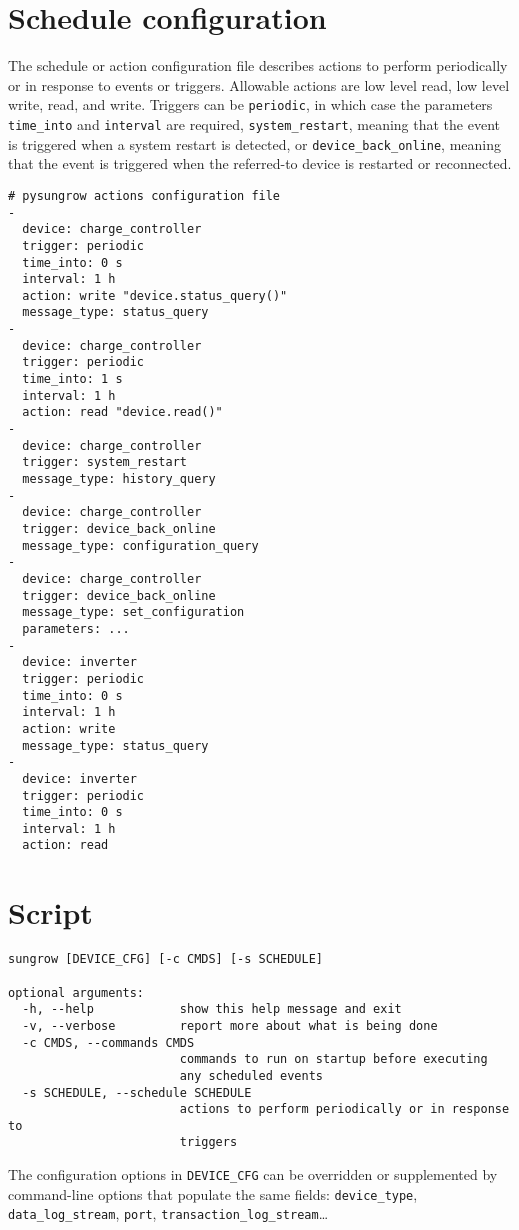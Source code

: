 \documentclass[pdftex,oneside,12pt,a4paper]{book}
\begin{document}
\section{Schedule configuration}
The schedule or action configuration file describes actions to perform periodically or in response to events or triggers.  Allowable actions are low level read, low level write, read, and write.  Triggers can be \verb|periodic|, in which case the parameters \verb|time_into| and \verb|interval| are required, \verb|system_restart|, meaning that the event is triggered when a system restart is detected, or \verb|device_back_online|, meaning that the event is triggered when the referred-to device is restarted or reconnected. 
\begin{verbatim}
# pysungrow actions configuration file
-
  device: charge_controller
  trigger: periodic
  time_into: 0 s
  interval: 1 h
  action: write "device.status_query()"
  message_type: status_query
-
  device: charge_controller
  trigger: periodic
  time_into: 1 s
  interval: 1 h
  action: read "device.read()"
-
  device: charge_controller
  trigger: system_restart
  message_type: history_query
-
  device: charge_controller
  trigger: device_back_online
  message_type: configuration_query
-
  device: charge_controller
  trigger: device_back_online
  message_type: set_configuration
  parameters: ...
-
  device: inverter
  trigger: periodic
  time_into: 0 s
  interval: 1 h
  action: write
  message_type: status_query
-
  device: inverter
  trigger: periodic
  time_into: 0 s
  interval: 1 h
  action: read
\end{verbatim}

\section{Script}
\begin{verbatim}
sungrow [DEVICE_CFG] [-c CMDS] [-s SCHEDULE]

optional arguments:
  -h, --help            show this help message and exit
  -v, --verbose         report more about what is being done
  -c CMDS, --commands CMDS
                        commands to run on startup before executing
                        any scheduled events
  -s SCHEDULE, --schedule SCHEDULE
                        actions to perform periodically or in response to
                        triggers
\end{verbatim}
The configuration options in \verb|DEVICE_CFG| can be overridden or supplemented by command-line options that populate the same fields: \verb|device_type|, \verb|data_log_stream|, \verb|port|, \verb|transaction_log_stream|\ldots
\end{document}
